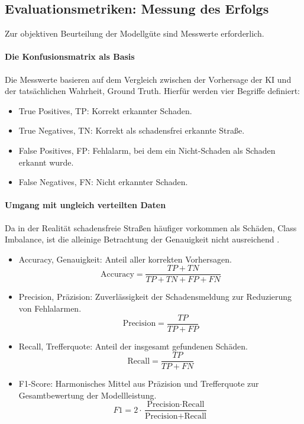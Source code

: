 \subsection{Evaluationsmetriken: Messung des Erfolgs}
\label{subsec:metriken}

Zur objektiven Beurteilung der Modellgüte sind Messwerte erforderlich.

\paragraph{Die Konfusionsmatrix als Basis}
Die Messwerte basieren auf dem Vergleich zwischen der Vorhersage der KI und der tatsächlichen Wahrheit, Ground Truth. Hierfür werden vier Begriffe definiert:
\begin{itemize}
    \item True Positives, TP: Korrekt erkannter Schaden.
    \item True Negatives, TN: Korrekt als schadensfrei erkannte Straße.
    \item False Positives, FP: Fehlalarm, bei dem ein Nicht-Schaden als Schaden erkannt wurde.
    \item False Negatives, FN: Nicht erkannter Schaden.
\end{itemize}

\paragraph{Umgang mit ungleich verteilten Daten}
Da in der Realität schadensfreie Straßen häufiger vorkommen als Schäden, Class Imbalance, ist die alleinige Betrachtung der Genauigkeit nicht ausreichend \cite[Kapitel 5.7]{halak2026_convolutional}.

\begin{itemize}
    \item Accuracy, Genauigkeit: Anteil aller korrekten Vorhersagen.
    \begin{equation}
        \text{Accuracy} = \frac{TP + TN}{TP + TN + FP + FN}
    \end{equation}

    \item Precision, Präzision: Zuverlässigkeit der Schadensmeldung zur Reduzierung von Fehlalarmen.
    \begin{equation}
        \text{Precision} = \frac{TP}{TP + FP}
    \end{equation}

    \item Recall, Trefferquote: Anteil der insgesamt gefundenen Schäden.
    \begin{equation}
        \text{Recall} = \frac{TP}{TP + FN}
    \end{equation}

    \item F1-Score: Harmonisches Mittel aus Präzision und Trefferquote zur Gesamtbewertung der Modellleistung.
    \begin{equation}
        F1 = 2 \cdot \frac{\text{Precision} \cdot \text{Recall}}{\text{Precision} + \text{Recall}}
    \end{equation}
\end{itemize}

